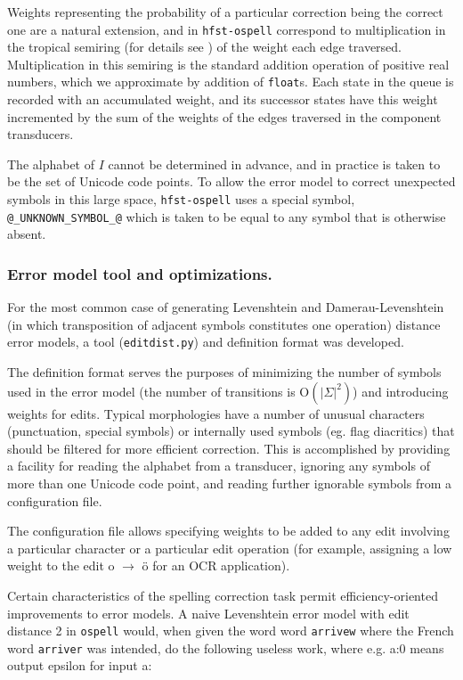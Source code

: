 \documentclass[draft]{llncs}
\begin{document}
Weights representing the probability of a particular correction being the
correct one are a natural extension, and in \verb!hfst-ospell! correspond to
multiplication in the tropical semiring (for details see \cite{openfst/2007})
of the weight each edge
traversed. Multiplication in this semiring is the standard addition operation
of positive real numbers, which we approximate by addition of \verb!float!s.
Each state in the queue is recorded with an accumulated weight, and its
successor states have this weight incremented by the sum of the weights of
the edges traversed in the component transducers.

The alphabet of $I$ cannot be determined in advance, and in practice is taken
to be the set of Unicode code points. To allow the error model to correct
unexpected symbols in this large space, \verb!hfst-ospell! uses a special
symbol, \verb!@_UNKNOWN_SYMBOL_@! which is taken to be equal to any symbol
that is otherwise absent.

\subsubsection{Error model tool and optimizations.}
For the most common case of generating Levenshtein and
Damerau-Levenshtein (in which transposition of adjacent symbols constitutes
one operation) distance error models, a tool (\verb!editdist.py!) and
definition format was developed.

The definition format serves the purposes of minimizing the number of symbols
used in the error model (the number of transitions is $\mathrm{O}(|\Sigma|^2)$)
and introducing weights for edits. Typical
morphologies have a number of unusual characters (punctuation, special symbols)
or internally used symbols (eg. flag diacritics) that should be filtered for
more efficient correction. This is accomplished by providing a facility for
reading the alphabet from a transducer, ignoring any symbols of more than
one Unicode code point, and reading further ignorable symbols from a
configuration file.

The configuration file allows specifying weights to be added to any edit
involving a particular character or a particular edit operation (for example,
assigning a low weight to the edit o $\rightarrow$ ö for an OCR application).

Certain characteristics of the spelling correction task permit
efficiency-oriented improvements to error models. A naive Levenshtein error
model with edit distance 2 in \verb!ospell! would, when given the word
word \verb!arrivew! where the French word \verb!arriver! was intended,
do the following useless work, where e.g. a:0 means output epsilon for input a:
\end{document}
